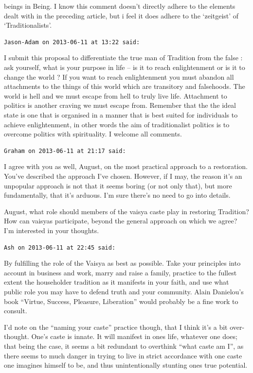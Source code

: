 \begin{footnotesize}
\begin{sffamily}
beings in Being. I know this comment doesn't directly adhere to the elements dealt with in the preceding article, but i feel it does adhere to the `zeitgeist' of `Traditionalists'.

\hfill

\texttt{Jason-Adam on 2013-06-11 at 13:22 said:}

I submit this proposal to differentiate the true man of Tradition from the false : ask yourself, what is your purpose in life -- is it to reach enlightenment or is it to change the world ? If you want to reach enlightenment you must abandon all attachments to the things of this world which are transitory and falsehoods. The world is hell and we must escape from hell to truly live life. Attachment to politics is another craving we must escape from. Remember that the the ideal state is one that is organised in a manner that is best suited for individuals to achieve enlightenment, in other words the aim of traditionalist politics is to overcome politics with spirituality. I welcome all comments.

\hfill

\texttt{Graham on 2013-06-11 at 21:17 said:}

I agree with you as well, August, on the most practical approach to a restoration. You've described the approach I've chosen. However, if I may, the reason it's an unpopular approach is not that it seems boring (or not only that), but more fundamentally, that it's arduous. I'm sure there's no need to go into details.

August, what role should members of the vaisya caste play in restoring Tradition? How can vaisyas participate, beyond the general approach on which we agree? I'm interested in your thoughts.

\hfill

\texttt{Ash on 2013-06-11 at 22:45 said:}

By fulfilling the role of the Vaisya as best as possible. Take your principles into account in business and work, marry and raise a family, practice to the fullest extent the householder tradition as it manifests in your faith, and use what public role you may have to defend truth and your community. Alain Danielou's book ``Virtue, Success, Pleasure, Liberation'' would probably be a fine work to consult.

I'd note on the ``naming your caste'' practice though, that I think it's a bit over-thought. One's caste is innate. It will manifest in ones life, whatever one does; that being the case, it seems a bit redundant to overthink ``what caste am I'', as there seems to much danger in trying to live in strict accordance with one caste one imagines himself to be, and thus unintentionally stunting ones true potential.


\end{sffamily}
\end{footnotesize}
